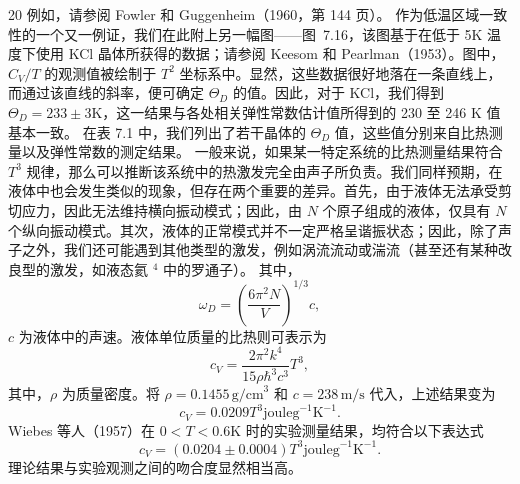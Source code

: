 20 例如，请参阅 Fowler 和 Guggenheim（1960，第 144 页）。
作为低温区域一致性的一个又一例证，我们在此附上另一幅图——图~7.16，该图基于在低于 5K 温度下使用 KCl 晶体所获得的数据；请参阅 Keesom 和 Pearlman（1953）。图中，\(C_{V}/T\) 的观测值被绘制于 \(T^{2}\) 坐标系中。显然，这些数据很好地落在一条直线上，而通过该直线的斜率，便可确定 \(\Theta_{D}\) 的值。因此，对于 KCl，我们得到 \(\Theta_{D} = 233 \pm 3\)K，这一结果与各处相关弹性常数估计值所得到的 230 至 246 K 值基本一致。
在表 7.1 中，我们列出了若干晶体的 \(\Theta_{D}\) 值，这些值分别来自比热测量以及弹性常数的测定结果。
一般来说，如果某一特定系统的比热测量结果符合 \(T^3\) 规律，那么可以推断该系统中的热激发完全由声子所负责。我们同样预期，在液体中也会发生类似的现象，但存在两个重要的差异。首先，由于液体无法承受剪切应力，因此无法维持横向振动模式；因此，由 \(N\) 个原子组成的液体，仅具有 \(N\) 个纵向振动模式。其次，液体的正常模式并不一定严格呈谐振状态；因此，除了声子之外，我们还可能遇到其他类型的激发，例如涡流流动或湍流（甚至还有某种改良型的激发，如液态氦 \(^{4}\) 中的罗通子）。
其中，
\begin{equation}\tag{7.4.23}\label{eq:7.4.23}
\omega _ { D } = \left( \frac { 6 \pi ^{2} N } { V } \right) ^{1 / 3} c ,
\end{equation}
\(c\) 为液体中的声速。液体单位质量的比热则可表示为
\begin{equation}\tag{7.4.24}\label{eq:7.4.24}
c _ { V } = \frac { 2 \pi ^{2} k ^{4} } { 15 \rho \hbar ^{3} c ^{3} } T ^{3} ,
\end{equation}
其中，\(\rho\) 为质量密度。将 \(\rho = 0.1455\,\mathrm{g/cm}^3\) 和 \(c = 238\,\mathrm{m/s}\) 代入，上述结果变为
\begin{equation}\tag{7.4.25}\label{eq:7.4.25}
c _ { V } = 0 . 02 09 T ^{3} \mathrm { j o u l e g } ^{- 1} \mathrm { K } ^{- 1} .
\end{equation}
Wiebes 等人（1957）在 \(0 < T < 0.6\)K 时的实验测量结果，均符合以下表达式
\begin{equation}\tag{7.4.26}\label{eq:7.4.26}
c _ { V } = ( 0 . 02 04 \pm 0 . 00 04 ) T ^{3} \mathrm { j o u l e g } ^{- 1} \mathrm { K } ^{- 1} .
\end{equation}
理论结果与实验观测之间的吻合度显然相当高。
